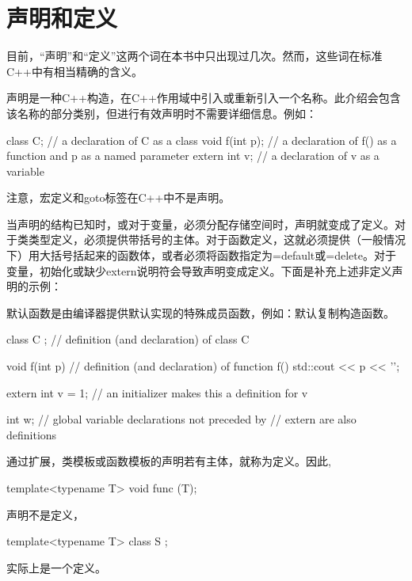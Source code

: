 \section{声明和定义}

目前，“声明”和“定义”这两个词在本书中只出现过几次。然而，这些词在标准C++中有相当精确的含义。

声明是一种C++构造，在C++作用域中引入或重新引入一个名称。此介绍会包含该名称的部分类别，但进行有效声明时不需要详细信息。例如：

\begin{cpp}
class C; // a declaration of C as a class
void f(int p); // a declaration of f() as a function and p as a named parameter
extern int v; // a declaration of v as a variable
\end{cpp}

注意，宏定义和goto标签在C++中不是声明。

当声明的结构已知时，或对于变量，必须分配存储空间时，声明就变成了定义。对于类类型定义，必须提供带括号的主体。对于函数定义，这就必须提供（一般情况下）用大括号括起来的函数体，或者必须将函数指定为=default或=delete。对于变量，初始化或缺少extern说明符会导致声明变成定义。下面是补充上述非定义声明的示例：

\begin{notice}
默认函数是由编译器提供默认实现的特殊成员函数，例如：默认复制构造函数。
\end{notice}

\begin{cpp}
class C {}; // definition (and declaration) of class C

void f(int p) { // definition (and declaration) of function f()
	std::cout << p << '\n';
}

extern int v = 1; // an initializer makes this a definition for v

int w; // global variable declarations not preceded by
// extern are also definitions
\end{cpp}

通过扩展，类模板或函数模板的声明若有主体，就称为定义。因此,

\begin{cpp}
template<typename T>
void func (T);
\end{cpp}

声明不是定义，

\begin{cpp}
template<typename T>
class S {};
\end{cpp}

实际上是一个定义。

